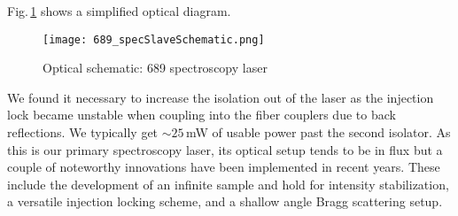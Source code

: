 Fig.\,\ref{fig:689specSch} shows a simplified optical diagram.
	\begin{figure}
	\centerline{
		\texttt{[image: 689\_specSlaveSchematic.png]}}
		\caption{Optical schematic: 689 spectroscopy laser}
		 \label{fig:689specSch}
	\end{figure}
We found it necessary to increase the isolation out of the laser as the injection lock became unstable when coupling into the fiber couplers due to back reflections.
We typically get $\sim25$\,mW of usable power past the second isolator.
As this is our primary spectroscopy laser, its optical setup tends to be in flux but a couple of noteworthy innovations have been implemented in recent years.
These include the development of an infinite sample and hold for intensity stabilization, a versatile injection locking scheme, and a shallow angle Bragg scattering setup.

